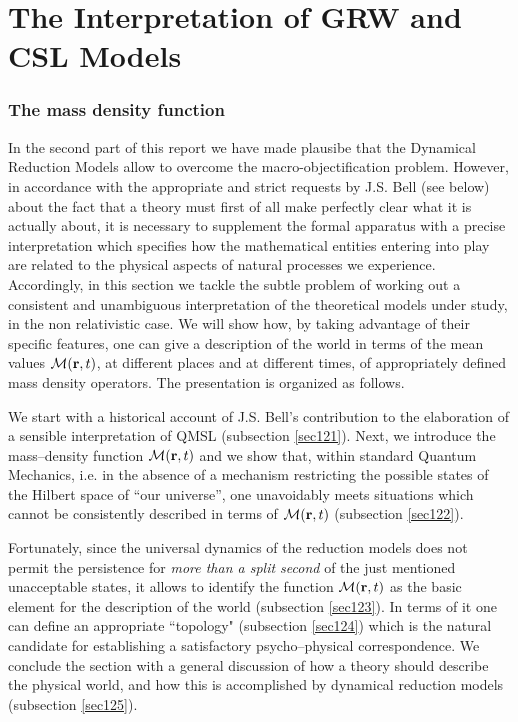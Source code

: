 \documentclass[12pt]{article}
\begin{document}
\newpage

\part{The Interpretation of GRW and CSL Models}

\section{The mass density function} \label{sec012}

    In the second part of this report we have made plausibe that the
Dynamical Reduction Models allow to overcome the macro-objectification
problem. However, in accordance with the appropriate and strict requests
by J.S. Bell (see below) about the fact that a theory must first of
all make  perfectly clear what it is actually about, it is necessary to
supplement the formal apparatus with a precise interpretation which
specifies how the mathematical entities entering into play are related to
the physical aspects of natural processes we experience.
Accordingly, in this section we tackle the subtle problem of working out a
consistent and unambiguous interpretation of the theoretical  models
under study, in the non relativistic case. We will show how, by taking
advantage of their specific features, one can give a description of the
world in terms of the mean values ${\mathcal M}({\bf r},t)$, at different
places and at different times, of appropriately defined mass density
operators. The presentation is organized as follows.

We start with a historical account of J.S. Bell's contribution to
the elaboration of a sensible interpretation of QMSL (subsection
\ref{sec121}). Next, we introduce the mass--density function
${\mathcal M}({\bf r},t)$ and we show that, within standard
Quantum Mechanics, i.e. in the absence of a mechanism restricting
the possible states of the Hilbert space of ``our universe'', one
unavoidably meets situations which cannot be consistently
described in terms of ${\mathcal M}({\bf r},t)$ (subsection
\ref{sec122}).

Fortunately, since the universal dynamics of the reduction models
does not permit  the persistence for \cite{bells} {\it more than a
split second} of the just mentioned unacceptable states, it allows  to
identify the function ${\mathcal M}({\bf r},t)$ as the basic element for
the description of the world (subsection \ref{sec123}). In terms of it
one can  define an appropriate ``topology" (subsection
\ref{sec124}) which is the natural candidate for establishing a
satisfactory psycho--physical correspondence. We conclude the
section with a general discussion of how a theory should describe
the physical world, and how this is accomplished by dynamical
reduction models (subsection \ref{sec125}).
\end{document}
